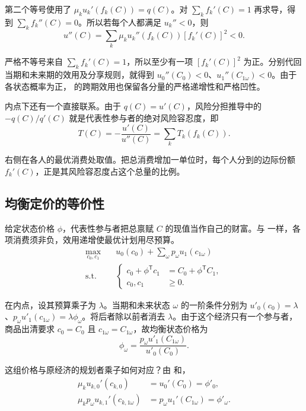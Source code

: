 第二个等号使用了 $\mu_k u_k'(f_k(C))=q(C)$。对 $\sum_k f_k'(C)=1$ 再求导，得到 $\sum_k f_k''(C)=0$。所以若每个人都满足 $u_k''<0$，则
\[
 u''(C)=\sum_k\mu_k u_k''(f_k(C))[f_k'(C)]^2<0.
\]

严格不等号来自 $\sum_k f_k'(C)=1$，所以至少有一项 $[f_k'(C)]^2$ 为正。分别代回当期和未来期的效用及分享规则，就得到 $u_0''(C_0)<0$、$u_1''(C_{1\omega})<0$。由于各状态概率为正， 的跨期效用也保留各分量的严格递增性和严格凹性。

内点下还有一个直接联系。由于 $q(C)=u'(C)$，风险分担推导中的 $-q(C)/q'(C)$ 就是代表性参与者的绝对风险容忍度，即
\[
 T(C)=-\frac{u'(C)}{u''(C)}
      =\sum_k T_k(f_k(C)).
\]

右侧在各人的最优消费处取值。把总消费增加一单位时，每个人分到的边际份额 $f_k'(C)$，正是其风险容忍度占这个总量的比例。

\subsection{均衡定价的等价性}
给定状态价格 $\phi$，代表性参与者把总禀赋 $C$ 的现值当作自己的财富。与 一样，各项消费须非负，效用递增使最优计划用尽预算。
\[
 \begin{aligned}
 \max_{c_0,c_1}\quad &u_0(c_0)+\sum_\omega p_\omega u_1(c_{1\omega})\\
 \text{s.t.}\quad &
 \left\{\begin{aligned}
 c_0+\phi^{\mathsf T}c_1&=C_0+\phi^{\mathsf T}C_1,\\
 c_0,c_1&\ge0.
 \end{aligned}\right.
 \end{aligned}
\]

在内点，设其预算乘子为 $\lambda$。当期和未来状态 $\omega$ 的一阶条件分别为 $u'_0(c_0)=\lambda$、$p_\omega u'_1(c_{1\omega})=\lambda\phi_\omega$。将后者除以前者消去 $\lambda$。由于这个经济只有一个参与者，商品出清要求 $c_0=C_0$ 且 $c_{1\omega}=C_{1\omega}$，故均衡状态价格为
\[
 \phi_\omega=\frac{p_\omega u'_1(C_{1\omega})}{u'_0(C_0)}.
\]

这组价格与原经济的规划者乘子如何对应？由 和，
\begin{equation}
 \begin{aligned}
 \mu_k u_{k,0}'(c_{k,0})&=u_0'(C_0)=\phi'_0,\\
 \mu_k p_\omega u_{k,1}'(c_{k,1\omega})
 &=p_\omega u_1'(C_{1\omega})=\phi'_\omega.
 \end{aligned}\label{eq:wj-10-15}
\end{equation}

